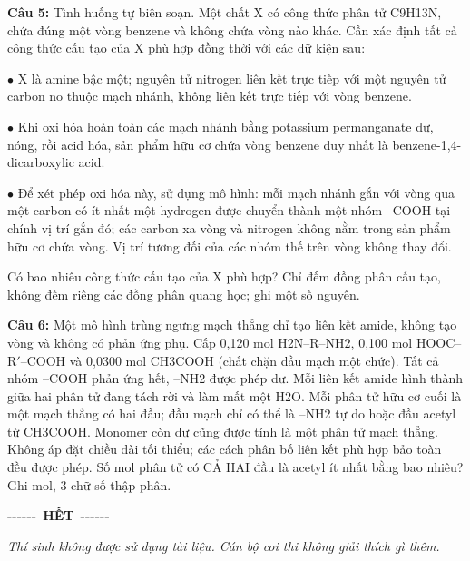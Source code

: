 \documentclass[12pt,a4paper]{article}
\begin{document}
\par\noindent\begin{minipage}{\linewidth}
\noindent\textbf{Câu 5:} Tình huống tự biên soạn. Một chất X có công thức phân tử C9H13N, chứa đúng một vòng benzene và không chứa vòng nào khác. Cần xác định tất cả công thức cấu tạo của X phù hợp đồng thời với các dữ kiện sau:\par
\(\bullet\) X là amine bậc một; nguyên tử nitrogen liên kết trực tiếp với một nguyên tử carbon no thuộc mạch nhánh, không liên kết trực tiếp với vòng benzene.\par
\(\bullet\) Khi oxi hóa hoàn toàn các mạch nhánh bằng potassium permanganate dư, nóng, rồi acid hóa, sản phẩm hữu cơ chứa vòng benzene duy nhất là benzene-1,4-dicarboxylic acid.\par
\(\bullet\) Để xét phép oxi hóa này, sử dụng mô hình: mỗi mạch nhánh gắn với vòng qua một carbon có ít nhất một hydrogen được chuyển thành một nhóm --COOH tại chính vị trí gắn đó; các carbon xa vòng và nitrogen không nằm trong sản phẩm hữu cơ chứa vòng. Vị trí tương đối của các nhóm thế trên vòng không thay đổi.\par
Có bao nhiêu công thức cấu tạo của X phù hợp? Chỉ đếm đồng phân cấu tạo, không đếm riêng các đồng phân quang học; ghi một số nguyên.\par
\end{minipage}\par\vspace{0.12cm}

\par\noindent\begin{minipage}{\linewidth}
\noindent\textbf{Câu 6:} Một mô hình trùng ngưng mạch thẳng chỉ tạo liên kết amide, không tạo vòng và không có phản ứng phụ. Cấp 0,120 mol H2N--R--NH2, 0,100 mol HOOC--R\(\prime\)--COOH và 0,0300 mol CH3COOH (chất chặn đầu mạch một chức). Tất cả nhóm --COOH phản ứng hết, --NH2 được phép dư. Mỗi liên kết amide hình thành giữa hai phân tử đang tách rời và làm mất một H2O. Mỗi phân tử hữu cơ cuối là một mạch thẳng có hai đầu; đầu mạch chỉ có thể là --NH2 tự do hoặc đầu acetyl từ CH3COOH. Monomer còn dư cũng được tính là một phân tử mạch thẳng. Không áp đặt chiều dài tối thiểu; các cách phân bố liên kết phù hợp bảo toàn đều được phép. Số mol phân tử có CẢ HAI đầu là acetyl ít nhất bằng bao nhiêu? Ghi mol, 3 chữ số thập phân.\par
\end{minipage}\par\vspace{0.12cm}
\begin{center}
{\bfseries -{}-{}-{}-{}-{}-}\ \textbf{HẾT}\ {\bfseries -{}-{}-{}-{}-{}-}
\end{center}
\vspace{0.15cm}
{\small\itshape
Thí sinh không được sử dụng tài liệu. Cán bộ coi thi không giải thích gì thêm.}
\end{document}
